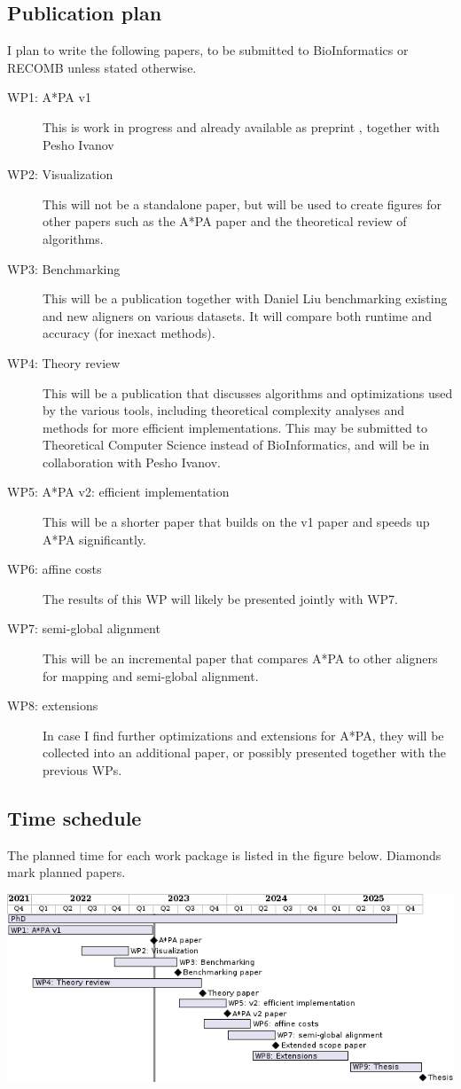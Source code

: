 \documentclass[11pt,english,a4paper]{article}
\begin{document}
\subsection{Publication plan}
\label{sec:org36ab377}
I plan to write the following papers, to be submitted to BioInformatics or
RECOMB unless stated otherwise.
\begin{description}
\item[{WP1: A*PA v1}] This is work in progress and already available as preprint \autocite{astarpa}, together with Pesho Ivanov
\item[{WP2: Visualization}] This will not be a standalone paper, but will be used to
create figures for other papers such as the A*PA paper and the theoretical
review of algorithms.
\item[{WP3: Benchmarking}] This will be a publication together with Daniel Liu
benchmarking existing and new aligners on various datasets. It will compare
both runtime and accuracy (for inexact methods).
\item[{WP4: Theory review}] This will be a publication that discusses algorithms and
optimizations used by the various tools, including theoretical
complexity analyses and methods for more efficient implementations. This may
be submitted to Theoretical Computer Science instead of BioInformatics, and
will be in collaboration with Pesho Ivanov.
\item[{WP5: A*PA v2: efficient implementation}] This will be a shorter paper that
builds on the v1 paper and speeds up A*PA significantly.
\item[{WP6: affine costs}] The results of this WP will likely be presented jointly
with WP7.
\item[{WP7: semi-global alignment}] This will be an incremental paper that compares
A*PA to other aligners for mapping and semi-global alignment.
\item[{WP8: extensions}] In case I find further optimizations and extensions for
A*PA, they will be collected into an additional paper, or possibly presented
together with the previous WPs.
\end{description}

\subsection{Time schedule}
\label{sec:org2be306a}
The planned time for each work package is listed in the figure below. Diamonds
mark planned papers.

\begin{center}
\includegraphics[width=.9\linewidth]{time-schedule.png}
\end{center}
\end{document}

